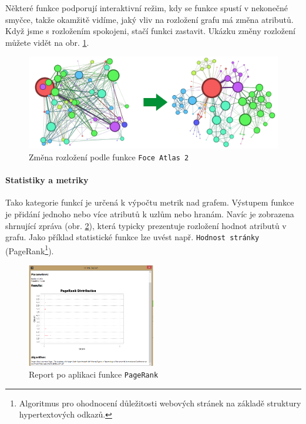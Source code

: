 \documentclass[thesis=M,czech]{FITthesis}[2014/05/6]
\begin{document}
Některé funkce podporují interaktivní režim, kdy se funkce spustí v nekonečné smyčce, takže okamžitě vidíme, jaký vliv na rozložení grafu má změna atributů. Když jsme s rozložením spokojeni,
stačí funkci zastavit. Ukázku změny rozložení můžete vidět na obr. \ref{fig:gephi-layout}.

\begin{figure}\centering
 	\includegraphics[width=1\textwidth]{images/gephi/layout_before-after}
 	\caption[Změna rozložení podle funkce \texttt{Foce Atlas 2}]{Změna rozložení podle funkce \texttt{Foce Atlas 2}}\label{fig:gephi-layout}
\end{figure}

\paragraph{Statistiky a metriky}
Tako kategorie funkcí je určená k výpočtu metrik nad grafem. Výstupem funkce je přidání jednoho nebo více atributů k uzlům nebo hranám. Navíc je zobrazena
shrnující zpráva (obr. \ref{fig:gephi-pagerank}), která typicky prezentuje rozložení hodnot atributů v grafu. Jako příklad statistické funkce lze uvést např. \texttt{Hodnost stránky} (PageRank\footnote{Algoritmus
pro ohodnocení důležitosti webových stránek na základě struktury hypertextových odkazů.}).

\begin{figure}\centering
 	\includegraphics[width=0.5\textwidth]{images/gephi/statistics-pagerank}
 	\caption[Report po aplikaci funkce \texttt{PageRank}]{Report po aplikaci funkce \texttt{PageRank}}\label{fig:gephi-pagerank}
\end{figure}
\end{document}
